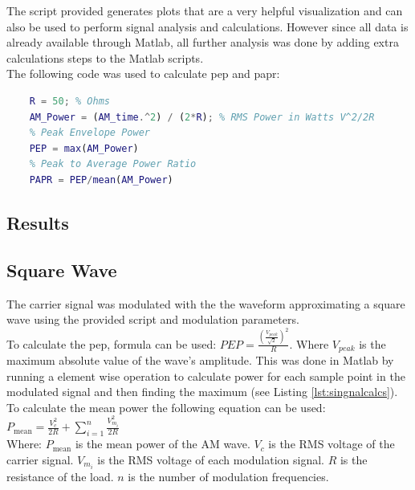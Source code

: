 \documentclass[a4paper]{article}
\begin{document}
\noindent The script provided generates plots that are a very helpful visualization and can also be used to perform signal analysis and calculations. However since all data is already available through Matlab, all further analysis was done by adding extra calculations steps to the Matlab scripts. \\

\noindent The following code was used to calculate \gls{pep} and \gls{papr}: \\

\begin{lstlisting}[language=Matlab, caption={Signal processing calculations}, label={lst:singnalcalcs}]
    % AM Power
    R = 50; % Ohms
    AM_Power = (AM_time.^2) / (2*R); % RMS Power in Watts V^2/2R
    % Peak Envelope Power
    PEP = max(AM_Power)
    % Peak to Average Power Ratio
    PAPR = PEP/mean(AM_Power)
\end{lstlisting}

\subsection{Results}
\subsection*{Square Wave}
    The carrier signal was modulated with the the waveform approximating a square wave using the provided script and modulation parameters. \\
    
    \noindent To calculate the \gls{pep}, formula can be used: $PEP = \frac{(\frac{V_{peak}}{\sqrt{2}})^2}{R}$. Where $V_{peak}$ is the maximum absolute value of the wave's amplitude. This was done in Matlab by running a element wise operation to calculate power for each sample point in the modulated signal and then finding the maximum (see Listing \ref{lst:singnalcalcs}).\\
    
    \noindent To calculate the mean power the following equation can be used: $P_{\text{mean}} = \frac{V_c^2}{2R} + \sum_{i=1}^{n} \frac{V_{m_i}^2}{2R}$ \\
    
    \noindent Where:
        \( P_{\text{mean}} \) is the mean power of the AM wave.
        \( V_c \) is the RMS voltage of the carrier signal.
        \( V_{m_i} \) is the RMS voltage of each modulation signal.
        \( R \) is the resistance of the load.
        \( n \) is the number of modulation frequencies. \\
        
\end{document}
